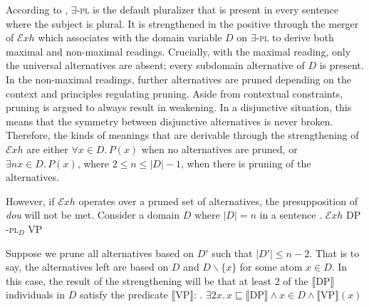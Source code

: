 \documentclass[12pt]{article}
\renewcommand{\setminus}{\mathbin{\backslash}}%
\newcommand{\Exh}{\ensuremath{\mathcal{E}\mathit{xh}}}
\begin{document}
%
%
%
According to \citet{bar-levImplicatureAccountHomogeneity2021}, \(\exists\)-\textsc{pl} is the default pluralizer that is present in every sentence where the subject is plural. 
It is strengthened in the positive through the merger of {\Exh} which associates with the domain variable \(D\) on \(\exists\)-\textsc{pl} to derive both maximal and non-maximal readings.
Crucially, with the maximal reading, only the universal alternatives are absent; every subdomain alternative of \(D\) is present.
In the non-maximal readings, further alternatives are pruned depending on the context and principles regulating pruning.
Aside from contextual constraints, pruning is argued to always result in weakening.
In a disjunctive situation, this means that the symmetry between disjunctive alternatives is never broken.
Therefore, the kinds of meanings that are derivable through the strengthening of {\Exh} are either \(\forall x \in D.\, P(x)\) when no alternatives are pruned, or \(\exists n x \in D.\, P(x)\), where \(2 \leq n \leq \lvert D \rvert - 1\), when there is pruning of the alternatives.

However, if {\Exh} operates over a pruned set of alternatives, the presupposition of \emph{dou} will not be met.
Consider a domain \(D\) where \(\lvert D \rvert = n\) in a sentence 
\ex. {\Exh} DP \exists-\textsc{pl}\(_D\) VP

Suppose we prune all alternatives based on \(D'\) such that \(\lvert D' \rvert \leq n - 2\).
That is to say, the alternatives left are based on \(D\) and \(D \setminus \{ x \}\) for some atom \(x \in D\).
In this case, the result of the strengthening will be that at least \(2\) of the \(\llbracket \text{DP} \rrbracket\) individuals in \(D\) satisfy the predicate \(\llbracket \text{VP} \rrbracket\):
\ex. \(\exists 2 x.\, x \sqsubseteq \llbracket \text{DP} \rrbracket \land x \in D \land \llbracket \text{VP} \rrbracket(x)\) \label{itm:sem_unpruned}
\end{document}
